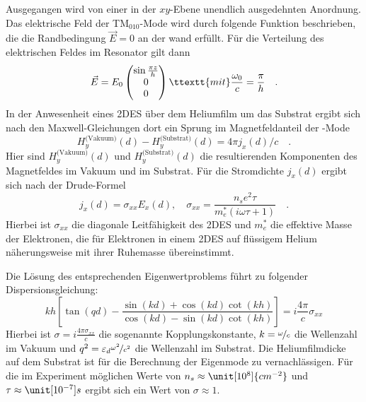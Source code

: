 Ausgegangen wird von einer in der $xy$-Ebene unendlich ausgedehnten Anordnung. Das elektrische Feld der TM$_\text{010}$-Mode wird durch folgende Funktion beschrieben, die die Randbedingung $\vec E=0$ an der \HR wand erfüllt. Für die Verteilung des elektrischen Feldes im Resonator gilt dann
	\begin{equation}
		\label{eqn:resshift_Edef}
		\vec E=E_0\begin{pmatrix}\sin\frac{\pi z}{h}\\
			0\\
			0\\\end{pmatrix}
		\ttextt{mit }
		\frac{\omega_0}{c}=\frac\pi{h}\quad.
	\end{equation}
In der Anwesenheit eines 2DES über dem Heliumfilm um das Substrat ergibt sich nach den Maxwell-Gleichungen dort ein Sprung im Magnetfeldanteil der \HR -Mode
	\begin{equation}
		H_y^\text{(Vakuum)}(d) - H_y^\text{(Substrat)}(d) = 4\pi j_x(d)/c\quad.
	\end{equation}
Hier sind $H_y^\text{(Vakuum)}(d)$ und $H_y^\text{(Substrat)}(d)$ die resultierenden Komponenten des Magnetfeldes im Vakuum und im Substrat. Für die Stromdichte $j_x(d)$ ergibt sich nach der Drude-Formel
	\begin{equation}
		j_x(d)=\sigma_{xx} E_x(d),\quad \sigma_{xx}=\frac{n_s e^2 \tau}
		{m_e^*(i\omega\tau + 1)}\quad.
	\end{equation}
Hierbei ist $\sigma_{xx}$ die diagonale Leitfähigkeit des 2DES und $m_e^*$ die
effektive Masse der Elektronen, die für Elektronen in einem 2DES auf flüssigem Helium näherungsweise mit ihrer Ruhemasse übereinstimmt.

Die Lösung des entsprechenden Eigenwertproblems führt zu folgender
Dispersionsgleichung:
	\begin{equation}
	\label{eqn:eigenfunction}
	k h\left[\tan(q d) - \frac{\sin{(k d)} + \cos{(k d)} \cot{(k h)}}{\cos{(k
	d)} - \sin{(k d)} \cot{(k h)}} \right]= i \frac{4 \pi}{c} \sigma_{xx}
	\end{equation}
Hierbei ist $\sigma = i\frac{4 \pi \sigma_{xx}}{c}$ die sogenannte
Kopplungskonstante, $k = \nicefrac{\omega}{c}$ die Wellenzahl im Vakuum und $q^2=\varepsilon_d\nicefrac{\omega^2}{c^2}$ die Wellenzahl im Substrat. Die Heliumfilmdicke auf dem Substrat ist für die Berechnung der Eigenmode zu vernachlässigen. Für die im Experiment
möglichen Werte von $n_s \approx \unit[10^8]{cm^{-2}}$ und $\tau \approx
\unit[10^{-7}]{s}$ ergibt sich ein Wert von $\sigma\approx1$. 

